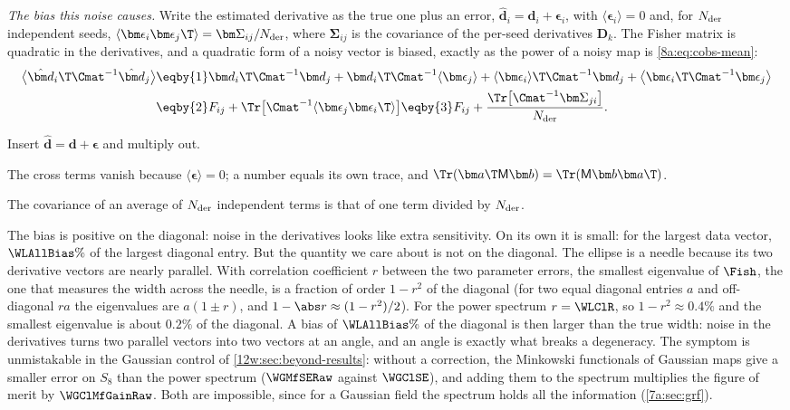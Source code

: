 \emph{The bias this noise causes.} Write the estimated derivative as the true one plus an error,
$\hat{\bm d}_i=\bm d_i+\bm\epsilon_i$, with $\langle\bm\epsilon_i\rangle=0$ and, for $N_{\rm der}$ independent seeds,
$\langle\bm\epsilon_i\bm\epsilon_j\T\rangle=\bm\Sigma_{ij}/N_{\rm der}$, where $\bm\Sigma_{ij}$ is the covariance of the
per-seed derivatives $\bm D_k$. The Fisher matrix is quadratic in the derivatives, and a quadratic form of a noisy
vector is biased, exactly as the power of a noisy map is \eqref{8a:eq:cobs-mean}:
\begin{align}
\bigl\langle\hat{\bm d}_i\T\Cmat^{-1}\hat{\bm d}_j\bigr\rangle
&\eqby{1}\bm d_i\T\Cmat^{-1}\bm d_j+\bm d_i\T\Cmat^{-1}\langle\bm\epsilon_j\rangle+\langle\bm\epsilon_i\rangle\T
\Cmat^{-1}\bm d_j+\bigl\langle\bm\epsilon_i\T\Cmat^{-1}\bm\epsilon_j\bigr\rangle
\nonumber\\
&\eqby{2}F_{ij}+\Tr\bigl[\Cmat^{-1}\langle\bm\epsilon_j\bm\epsilon_i\T\rangle\bigr]
\eqby{3}F_{ij}+\frac{\Tr\bigl[\Cmat^{-1}\bm\Sigma_{ji}\bigr]}{N_{\rm der}} .
\label{12w:eq:fisher-bias}
\end{align}
\begin{explain}
  \item Insert $\hat{\bm d}=\bm d+\bm\epsilon$ and multiply out.
  \item The cross terms vanish because $\langle\bm\epsilon\rangle=0$; a number equals its own trace, and
        $\Tr(\bm a\T\mathsf M\bm b)=\Tr(\mathsf M\bm b\bm a\T)$.
  \item The covariance of an average of $N_{\rm der}$ independent terms is that of one term divided by $N_{\rm der}$.
\end{explain}
The bias is positive on the diagonal: noise in the derivatives looks like extra sensitivity. On its own it is small:
for the largest data vector, $\WLAllBias\%$ of the largest diagonal entry. But the quantity we care about is not on
the diagonal. The ellipse is a needle because its two derivative vectors are nearly parallel. With correlation
coefficient $r$ between the two parameter errors, the smallest eigenvalue of $\Fish$, the one that measures the width
across the needle, is a fraction of order $1-r^2$ of the diagonal (for two equal diagonal entries $a$ and off-diagonal
$ra$ the eigenvalues are $a(1\pm r)$, and $1-\abs r\approx(1-r^2)/2$). For the power spectrum $r=\WLClR$, so
$1-r^2\approx0.4\%$ and the smallest eigenvalue is about $0.2\%$ of the diagonal. A bias of $\WLAllBias\%$ of the
diagonal is then larger than the true width: noise in the derivatives turns two parallel vectors into two vectors
at an angle, and an angle is exactly what breaks a degeneracy. The symptom is unmistakable in the Gaussian control
of \cref{12w:sec:beyond-results}: without a correction, the Minkowski functionals of Gaussian maps give a smaller
error on $S_8$ than the power spectrum ($\WGMfSERaw$ against $\WGClSE$), and adding them to the spectrum multiplies
the figure of merit by $\WGClMfGainRaw$. Both are impossible, since for a Gaussian field the spectrum holds all the
information (\cref{7a:sec:grf}).

